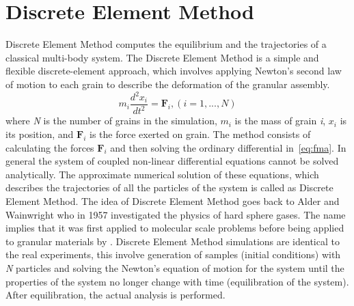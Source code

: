  
\section{Discrete Element Method}

Discrete Element Method computes the equilibrium and the trajectories of a 
classical 
multi-body system. The Discrete Element Method is a simple and flexible 
discrete-element 
approach, which involves applying Newton's second law of motion to each grain 
to describe the 
deformation of the granular assembly.  
\begin{equation} 
  {m}_{i}\frac{{{d}^{2}}{{x}_{i}}}{d{{t}^{2}}} = {{\mathbf{F}}_{i}}, 
(i=1,...,N 
  )
 \label{eq:fma}
\end{equation}
%
where \textit{N} is the number of grains in the simulation, $m_{\mathit{i}}$ 
is 
the mass of grain 
\textit{i}, $x_{\mathit{i}}$ is its position, and $\mathbf{F}_{\mathit{i}}$ is 
the force exerted 
on 
grain. The method consists of calculating the forces $\mathbf{F}_{\mathit{i}}$ 
and then solving 
the 
ordinary differential in~\cref{eq:fma}. In general the system of coupled 
non-linear 
differential equations cannot be solved analytically. The approximate 
numerical 
solution of these 
equations, which describes the trajectories of all the particles of the system 
is called as 
Discrete Element Method. The idea of Discrete Element Method goes back to 
Alder 
and Wainwright who 
in 1957 
investigated the physics of hard sphere gases. The name implies that it was 
first applied to 
molecular scale problems before being applied to granular materials by 
\citet{Cundall1979}. 
Discrete Element Method simulations are identical to the real experiments, 
this 
involve generation 
of 
samples (initial conditions) with \textit{N} particles and solving the 
Newton's 
equation of motion 
for the system until the properties of the system no longer change with time 
(equilibration of the 
system). After equilibration, the actual analysis is performed.

